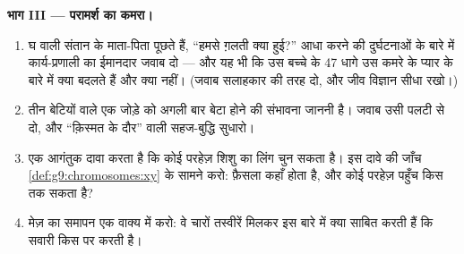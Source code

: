 \begin{problem}[{सप्ताहांत समस्या --- एक ही रोशनी वाली मेज़ पर चार
गुणसूत्र-चित्र}]
\medskip\noindent\textbf{भाग III --- परामर्श का कमरा।}
\begin{enumerate}[resume]
  \item {} घ वाली संतान के माता-पिता पूछते हैं, ``हमसे
        ग़लती क्या हुई?'' आधा करने की दुर्घटनाओं के बारे में
        कार्य-प्रणाली का ईमानदार जवाब दो --- और यह भी कि उस बच्चे के
        47 धागे उस कमरे के प्यार के बारे में क्या बदलते हैं और क्या
        नहीं। (जवाब सलाहकार की तरह दो, और जीव विज्ञान सीधा रखो।)
  \item तीन बेटियों वाले एक जोड़े को अगली बार बेटा होने की संभावना
        जाननी है। जवाब उसी पलटी से दो, और ``क़िस्मत के दौर'' वाली
        सहज-बुद्धि सुधारो।
  \item एक आगंतुक दावा करता है कि कोई परहेज़ शिशु का लिंग चुन सकता है।
        इस दावे की जाँच \cref{def:g9:chromosomes:xy} के सामने करो:
        फ़ैसला कहाँ होता है, और कोई परहेज़ पहुँच किस तक सकता है?
  \item मेज़ का समापन एक वाक्य में करो: वे चारों तस्वीरें मिलकर इस
        बारे में क्या साबित करती हैं कि  सवारी किस पर करती
        है।
\end{enumerate}
\end{problem}
